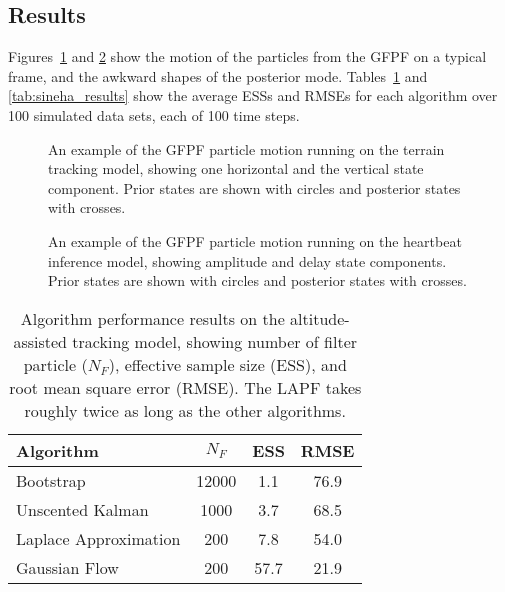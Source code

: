 \documentclass{article}
\begin{document}
\subsection{Results}

Figures~\ref{fig:drone_example_frame_deterministic} and \ref{fig:sineha_example_frame} show the motion of the particles from the GFPF on a typical frame, and the awkward shapes of the posterior mode. Tables~\ref{tab:drone_results} and \ref{tab:sineha_results} show the average ESSs and RMSEs for each algorithm over 100 simulated data sets, each of 100 time steps.

\begin{figure}
\centering

\caption{An example of the GFPF particle motion running on the terrain tracking model, showing one horizontal and the vertical state component. Prior states are shown with circles and posterior states with crosses.}
\label{fig:drone_example_frame_deterministic}
\end{figure}

\begin{figure}
\centering

\caption{An example of the GFPF particle motion running on the heartbeat inference model, showing amplitude and delay state components. Prior states are shown with circles and posterior states with crosses.}
\label{fig:sineha_example_frame}
\end{figure}

\begin{table}
\centering
\begin{tabular}{l||c|c|c}
Algorithm                                & $N_F$  & ESS  & RMSE \\
\hline
Bootstrap                                &  12000 & 1.1  & 76.9 \\
Unscented Kalman                         &   1000 & 3.7  & 68.5 \\
Laplace Approximation                    &    200 & 7.8  & 54.0 \\
Gaussian Flow                            &    200 & 57.7 & 21.9 \\
\end{tabular}
\caption{Algorithm performance results on the altitude-assisted tracking model, showing number of filter particle ($N_F$), effective sample size (ESS), and root mean square error (RMSE). The LAPF takes roughly twice as long as the other algorithms.}
\label{tab:drone_results}
\end{table}
\end{document}
